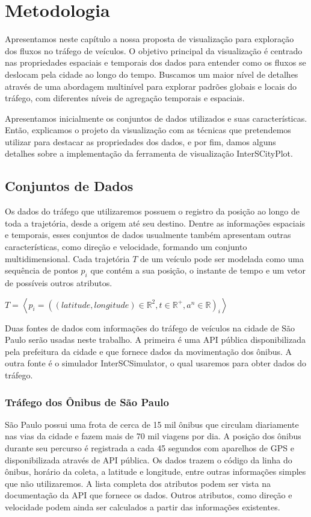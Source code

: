 \chapter{Metodologia}
\label{cap:metodologia}
 Apresentamos neste capítulo a nossa proposta de visualização para exploração
dos fluxos no tráfego de veículos. O objetivo principal da visualização é centrado
nas propriedades espaciais e temporais dos dados para entender
como os fluxos se deslocam pela cidade ao longo do tempo. Buscamos
um maior nível de detalhes através de uma abordagem multinível para
explorar padrões globais e locais do tráfego, com diferentes níveis de agregação
temporais e espaciais.

 Apresentamos inicialmente os conjuntos de dados
utilizados e suas características. Então, explicamos o projeto da visualização
com as técnicas que pretendemos utilizar para destacar as propriedades dos dados,
e por fim, damos alguns detalhes sobre a implementação da ferramenta de visualização
InterSCityPlot.

\section{Conjuntos de Dados}
   Os dados do tráfego que utilizaremos possuem o registro da posição ao longo
de toda a trajetória, desde a origem até seu destino. Dentre as informações
espaciais e temporais, esses conjuntos de dados usualmente também apresentam
outras características, como direção e velocidade, formando um conjunto
multidimensional. Cada trajetória $T$ de um veículo pode ser modelada como uma
sequência de pontos $p_i$ que contém a sua posição, o instante de tempo e um
vetor de possíveis outros atributos.

\begin{center}
$T = \left\langle p_i = ((latitude, longitude) \in \mathbb{R}^2, t \in \mathbb{R}^+, a^n \in \mathbb{R})_i \right\rangle$
\end{center}

  Duas fontes de dados com informações do tráfego de veículos na cidade de São
Paulo serão usadas neste trabalho. A primeira é uma API pública disponibilizada
pela prefeitura da cidade e que fornece dados da movimentação dos ônibus. A
outra fonte é o simulador InterSCSimulator, o qual usaremos para obter dados
do tráfego.

\subsection{Tráfego dos Ônibus de São Paulo}
São Paulo possui uma frota de  cerca de 15 mil ônibus que circulam diariamente
nas vias da cidade e fazem mais de 70 mil viagens por dia. A posição dos ônibus
durante seu percurso é registrada a cada 45 segundos com aparelhos de GPS e
disponibilizada através de API pública. Os dados trazem o código da linha do
ônibus, horário da coleta, a latitude e longitude, entre outras informações
simples que não utilizaremos. A lista completa dos atributos podem ser vista na
documentação da API que fornece os dados. Outros atributos, como direção e
velocidade podem ainda ser calculados a partir das informações existentes.

